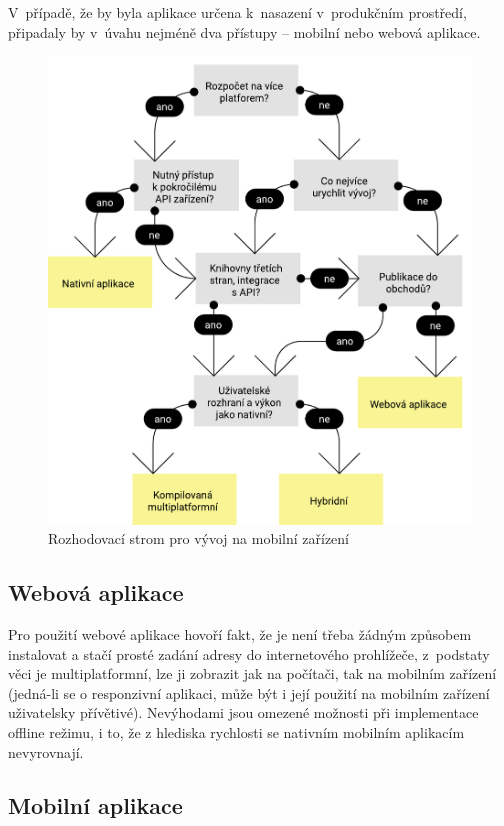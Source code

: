 \documentclass[twoside]{ctuthesis}
\begin{document}
V~případě, že by byla aplikace určena k~nasazení v~produkčním prostředí, připadaly by v~úvahu nejméně dva přístupy -- mobilní nebo webová aplikace.

\begin{figure}[h!]
	\includegraphics[scale=0.7]{img/app-decision-tree.pdf}
	\caption{Rozhodovací strom pro vývoj na mobilní zařízení}
	\label{appdecisiontree}
\end{figure}

\subsection{Webová aplikace}
Pro použití webové aplikace hovoří fakt, že je není třeba žádným způsobem instalovat a stačí prosté zadání adresy do internetového prohlížeče, z~podstaty věci je multiplatformní, lze ji zobrazit jak na počítači, tak na mobilním zařízení (jedná-li se o responzivní aplikaci, může být i její použití na mobilním zařízení uživatelsky přívětivé). Nevýhodami jsou omezené možnosti při implementace offline režimu, i to, že z hlediska rychlosti se nativním mobilním aplikacím nevyrovnají. \cite{stevens2018what}

\subsection{Mobilní aplikace}
\end{document}
